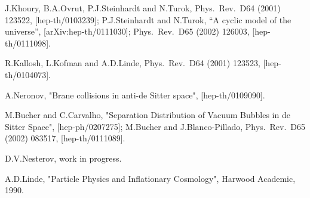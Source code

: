 \documentclass[a4paper,12pt]{article}
\begin{document}
\begin{thebibliography}{99}
J.Khoury, B.A.Ovrut, P.J.Steinhardt and N.Turok,
 Phys.\ Rev.\ D{64} (2001) 123522, [hep-th/0103239];
P.J.Steinhardt and N.Turok, ``A cyclic model of the universe'',
 [arXiv:hep-th/0111030];
 Phys.\ Rev.\ D{65} (2002) 126003, [hep-th/0111098].

R.Kallosh, L.Kofman and A.D.Linde,
 Phys.\ Rev.\ D{64} (2001) 123523, [hep-th/0104073].

A.Neronov,
 "Brane collisions in anti-de Sitter space", [hep-th/0109090].

M.Bucher and C.Carvalho, "Separation Distribution of Vacuum
Bubbles in de Sitter Space", [hep-ph/0207275]; M.Bucher and
J.Blanco-Pillado, Phys.\ Rev.\ D{65} (2002) 083517,
[hep-th/0111089].

D.V.Nesterov,
 work in progress.

A.D.Linde,
 "Particle Physics and Inflationary Cosmology", Harwood Academic, 1990.

\end{thebibliography}
\end{document}
